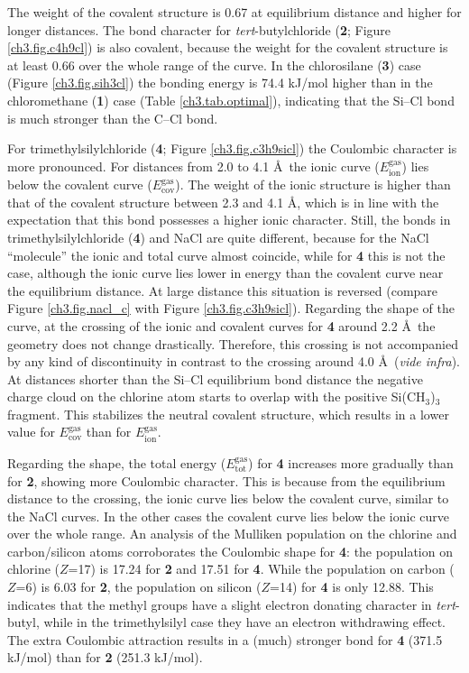 The weight of the covalent structure is 0.67 at equilibrium distance and higher for longer distances. The bond character for \textit{tert}-butylchloride (\textbf{2}; Figure \ref{ch3.fig.c4h9cl}) is also covalent, because the weight for the covalent structure is at least 0.66 over the whole range of the curve.
In the chlorosilane (\textbf{3}) case (Figure \ref{ch3.fig.sih3cl}) the bonding energy is 74.4 kJ/mol higher than in the chloromethane (\textbf{1}) case (Table \ref{ch3.tab.optimal}), indicating that the Si--Cl bond is much stronger than the C--Cl bond. 

For trimethylsilylchloride (\textbf{4}; Figure \ref{ch3.fig.c3h9sicl}) the Coulombic character is more pronounced. For distances from 2.0 to 4.1 \AA\  the ionic curve ($E_\mathrm{ion}^\mathrm{gas}$) lies below the covalent curve ($E_\mathrm{cov}^\mathrm{gas}$). The weight of the ionic structure is higher than that of the covalent structure between 2.3 and 4.1 \AA, which is in line with the expectation that this bond possesses a higher ionic character. Still, the bonds in trimethylsilylchloride (\textbf{4}) and NaCl are quite different, because for the NaCl ``molecule'' the ionic and total curve almost coincide, while for \textbf{4} this is not the case, although the ionic curve lies lower in energy than the covalent curve near the equilibrium distance. At large distance this situation is reversed (compare Figure \ref{ch3.fig.nacl_c} with Figure \ref{ch3.fig.c3h9sicl}). Regarding the shape of the curve, at the crossing of the ionic and covalent curves for \textbf{4} around 2.2 \AA\ the geometry does not change drastically. Therefore, this crossing is not accompanied by any kind of discontinuity in contrast to the crossing around 4.0 \AA\ (\textit{vide infra}). At distances shorter than the Si--Cl equilibrium bond distance the negative charge cloud on the chlorine atom starts to overlap with the positive Si(CH$_3$)$_3$ fragment. This stabilizes the neutral covalent structure, which results in a lower value for $E_\mathrm{cov}^\mathrm{gas}$ than for $E_\mathrm{ion}^\mathrm{gas}$. 

Regarding the shape, the total energy ($E_\mathrm{tot}^\mathrm{gas}$) for \textbf{4} increases more gradually than for \textbf{2}, showing more Coulombic character. This is because from the equilibrium distance to the crossing, the ionic curve lies below the covalent curve, similar to the NaCl curves. In the other cases the covalent curve lies below the ionic curve over the whole range. An analysis of the Mulliken population on the chlorine and carbon/silicon atoms corroborates the Coulombic shape for \textbf{4}: the population on chlorine ($Z$=17) is 17.24 for \textbf{2} and 17.51 for \textbf{4}. While the population on carbon ($Z$=6) is 6.03 for \textbf{2}, the population on silicon ($Z$=14) for \textbf{4} is only 12.88. This indicates that the methyl groups have a slight electron donating character in \textit{tert}-butyl, while in the trimethylsilyl case they have an electron withdrawing effect. The extra Coulombic attraction results in a (much) stronger bond for \textbf{4} (371.5 kJ/mol) than for \textbf{2} (251.3 kJ/mol). 

